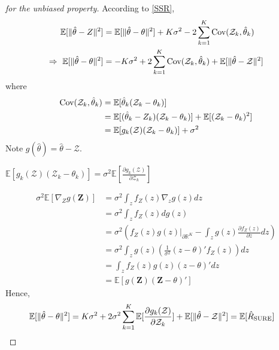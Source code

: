 \documentclass[11pt]{elegantbook}
\begin{document}
\begin{proof}[for the unbiased property]
    According to \eqref{SSR},
    \begin{equation}
        \begin{aligned}
            \mathbb{E}[\|\hat{\theta}-Z\|^2]&=\mathbb{E}[\|\hat{\theta}-\theta\|^2]+K\sigma^2-2\sum_{k=1}^K \textnormal{Cov}(\mathcal{Z}_k,\hat{\theta}_k)\\
            \Rightarrow\ \mathbb{E}[\|\hat{\theta}-\theta\|^2]&=-K\sigma^2+2\sum_{k=1}^K \textnormal{Cov}(\mathcal{Z}_k,\hat{\theta}_k)+\mathbb{E}[\|\hat{\theta}-\mathcal{Z}\|^2]
        \end{aligned}
        \nonumber
    \end{equation}
    where
    \begin{equation}
        \begin{aligned}
            \textnormal{Cov}(\mathcal{Z}_k,\hat{\theta}_k)&=\mathbb{E}[\hat{\theta}_k(\mathcal{Z}_k-\theta_k)]\\
            &=\mathbb{E}[(\hat{\theta}_k-Z_k)(\mathcal{Z}_k-\theta_k)]+\mathbb{E}[(\mathcal{Z}_k-\theta_k)^2]\\
            &=\mathbb{E}[g_k(\mathcal{Z})(\mathcal{Z}_k-\theta_k)]+\sigma^2
        \end{aligned}
        \nonumber
    \end{equation}
    Note $g(\hat{\theta})=\hat{\theta}-\mathcal{Z}$.
    \begin{claim}
        $\mathbb{E}[g_k(\mathcal{Z})(\mathcal{Z}_k-\theta_k)]=\sigma^2 \mathbb{E}[\frac{\partial g_k(\mathcal{Z})}{\partial \mathcal{Z}_k}]$
    \end{claim}
    \begin{equation}
        \begin{aligned}
            \sigma^2\mathbb{E}[\nabla_Z g(\mathbf{Z})]&=\sigma^2\int_z f_Z(z)\nabla_z g(z) dz\\
            &=\sigma^2\int_z f_Z(z)d g(z)\\
            &=\sigma^2\left(f_Z(z)g(z)\bigg|_{\partial\mathbb{R}^K}-\int_z g(z)\frac{\partial  f_Z(z)}{\partial z}dz\right)\\
            &=\sigma^2\int_z g(z)\left(\frac{1}{\sigma^2}(z-\theta)'f_Z(z)\right)dz\\
            &=\int_z f_Z(z)g(z)(z-\theta)' dz\\
            &=\mathbb{E}[g(\mathbf{Z})(\mathbf{Z}-\theta)']
        \end{aligned}
        \nonumber
    \end{equation}
    Hence,
    \begin{equation}
        \begin{aligned}
            \mathbb{E}[\|\hat{\theta}-\theta\|^2]&=K\sigma^2+2\sigma^2\sum_{k=1}^K \mathbb{E}[\frac{\partial g_k(\mathcal{Z})}{\partial \mathcal{Z}_k}]+\mathbb{E}[\|\hat{\theta}-\mathcal{Z}\|^2]=\mathbb{E}[\hat{R}_\textnormal{SURE}]
        \end{aligned}
        \nonumber
    \end{equation}
\end{proof}
\end{document}
